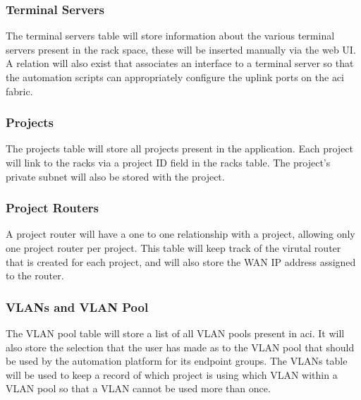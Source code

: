 \subsubsection{Terminal Servers}
\label{design:web-application:database:terminal-servers}
The terminal servers table will store information about the various terminal servers present in the rack space, these will be inserted manually via the web UI. A relation will also exist that associates an interface to a terminal server so that the automation scripts can appropriately configure the uplink ports on the \gls{aci} fabric.

\subsubsection{Projects}
\label{design:web-application:database:projects}
The projects table will store all projects present in the application. Each project will link to the racks via a project ID field in the racks table. The project's private subnet will also be stored with the project.

\subsubsection{Project Routers}
\label{design:web-application:database:project-routers}
A project router will have a one to one relationship with a project, allowing only one project router per project. This table will keep track of the virutal router that is created for each project, and will also store the WAN IP address assigned to the router.

\subsubsection{VLANs and VLAN Pool}
\label{design:web-application:database:vlan-and-vlan-pool}
The VLAN pool table will store a list of all VLAN pools present in \gls{aci}. It will also store the selection that the user has made as to the VLAN pool that should be used by the automation platform for its endpoint groups. The VLANs table will be used to keep a record of which project is using which VLAN within a VLAN pool so that a VLAN cannot be used more than once.
